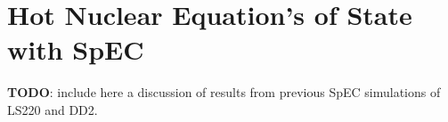 \chapter{Hot Nuclear Equation's of State with SpEC}
\label{chap:chapter-4}

\textbf{TODO}: include here a discussion of results from previous SpEC simulations of LS220 and DD2.